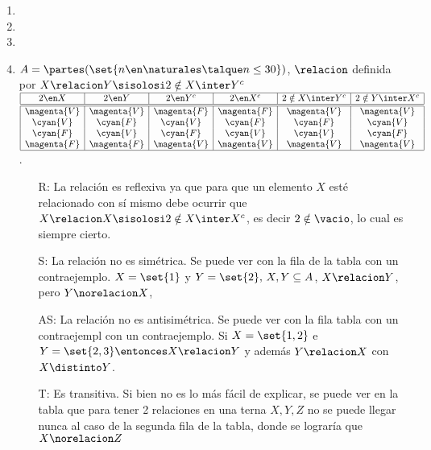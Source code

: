 \begin{enumerate}[label=\roman*)]
	\item \hacer
	\item \hacer
	\item \hacer
	\item $A = \partes(\set{n \en \naturales \talque n \leq 30})$, $\relacion$ definida por $X \relacion Y \sisolosi 2 \notin X \inter Y^c$\\
	      $\begin{array}{|c|c|c|c|c|c|}
			      \hline
			      2 \en X     & 2 \en Y     & 2 \en Y^c   & 2 \en X^c   & 2 \notin X \inter Y^c & 2 \notin Y \inter X^c \\ \hline  \hline
			      \magenta{V} & \magenta{V} & \magenta{F} & \magenta{F} & \magenta{V}           & \magenta{V}           \\
			      \cyan{V}    & \cyan{F}    & \cyan{V}    & \cyan{F}    & \cyan{F}              & \cyan{V}              \\
			      \cyan{F}    & \cyan{V}    & \cyan{F}    & \cyan{V}    & \cyan{V}              & \cyan{F}              \\
			      \magenta{F} & \magenta{F} & \magenta{V} & \magenta{V} & \magenta{V}           & \magenta{V}           \\ \hline
		      \end{array}$.\\
	      \begin{enumerate}
		      \item[R:]
		            La relación es reflexiva ya que para que un elemento $X$ esté relacionado con sí mismo debe ocurrir
		            que $X \relacion X \sisolosi 2 \notin X \inter X^c$, es decir $2 \notin \vacio$, lo cual es siempre cierto.

		      \item[S:]
		            La relación no es simétrica. Se puede ver con la  fila de la tabla con un contraejemplo.
		            $X = \set{1}$ y $Y = \set{2},\, X,Y \subseteq A$, $X \relacion Y$, pero $Y \norelacion X$,

		      \item[AS:]
		            La relación no es antisimétrica. Se puede ver con la  fila tabla con un contraejempl
		            con un contraejemplo. Si $X = \set{1,2}$ e $Y = \set{2,3} \entonces X \relacion Y$ y además $Y \relacion X$
		            con  $X \distinto Y$.

		      \item[T:]
		            Es transitiva. Si bien no es lo más fácil de explicar, se puede ver en la tabla que para tener 2 relaciones
		            en una terna $X, Y, Z$ no se puede llegar nunca al caso de la segunda fila de la tabla, donde se lograría que
		            $X \norelacion Z$
	      \end{enumerate}


\end{enumerate}
